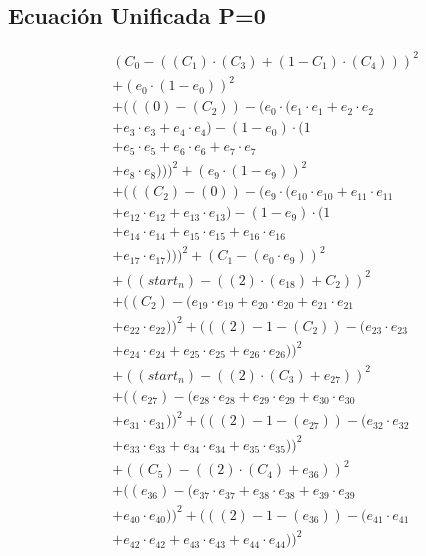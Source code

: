 \documentclass[10pt, a4paper]{article}
\begin{document}
\subsection*{Ecuación Unificada P=0}
\begin{align*}
& (C_{0} - ((C_{1})  \cdot  (C_{3}) + (1 - C_{1})  \cdot  (C_{4})))^{2} \\
& + (e_{0} \cdot (1 - e_{0}))^{2} \\
& + (((0) - (C_{2})) - (e_{0} \cdot (e_{1} \cdot e_{1} + e_{2} \cdot e_{2} \\
& + e_{3} \cdot e_{3} + e_{4} \cdot e_{4}) - (1 - e_{0}) \cdot (1 \\
& + e_{5} \cdot e_{5} + e_{6} \cdot e_{6} + e_{7} \cdot e_{7} \\
& + e_{8} \cdot e_{8})))^{2} + (e_{9} \cdot (1 - e_{9}))^{2} \\
& + (((C_{2}) - (0)) - (e_{9} \cdot (e_{10} \cdot e_{10} + e_{11} \cdot e_{11} \\
& + e_{12} \cdot e_{12} + e_{13} \cdot e_{13}) - (1 - e_{9}) \cdot (1 \\
& + e_{14} \cdot e_{14} + e_{15} \cdot e_{15} + e_{16} \cdot e_{16} \\
& + e_{17} \cdot e_{17})))^{2} + (C_{1} - (e_{0} \cdot e_{9}))^{2} \\
& + ((start_n) - ((2)  \cdot  (e_{18}) + C_{2}))^{2} \\
& + ((C_{2}) - (e_{19} \cdot e_{19} + e_{20} \cdot e_{20} + e_{21} \cdot e_{21} \\
& + e_{22} \cdot e_{22}))^{2} + (((2) - 1 - (C_{2})) - (e_{23} \cdot e_{23} \\
& + e_{24} \cdot e_{24} + e_{25} \cdot e_{25} + e_{26} \cdot e_{26}))^{2} \\
& + ((start_n) - ((2)  \cdot  (C_{3}) + e_{27}))^{2} \\
& + ((e_{27}) - (e_{28} \cdot e_{28} + e_{29} \cdot e_{29} + e_{30} \cdot e_{30} \\
& + e_{31} \cdot e_{31}))^{2} + (((2) - 1 - (e_{27})) - (e_{32} \cdot e_{32} \\
& + e_{33} \cdot e_{33} + e_{34} \cdot e_{34} + e_{35} \cdot e_{35}))^{2} \\
& + ((C_{5}) - ((2)  \cdot  (C_{4}) + e_{36}))^{2} \\
& + ((e_{36}) - (e_{37} \cdot e_{37} + e_{38} \cdot e_{38} + e_{39} \cdot e_{39} \\
& + e_{40} \cdot e_{40}))^{2} + (((2) - 1 - (e_{36})) - (e_{41} \cdot e_{41} \\
& + e_{42} \cdot e_{42} + e_{43} \cdot e_{43} + e_{44} \cdot e_{44}))^{2} \\

\end{align*}
\end{document}
